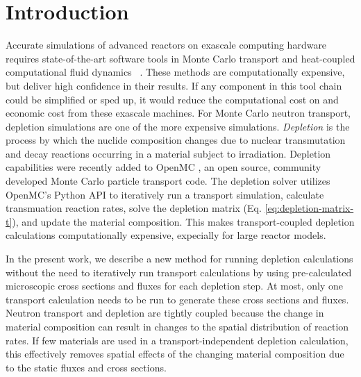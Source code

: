 \section{Introduction}\label{}

    Accurate simulations of advanced reactors on exascale computing hardware
    requires state-of-the-art software tools in Monte Carlo transport and
    heat-coupled computational fluid dynamics
    ~\citep{romano2021nse,merzari2023sc}.  These methods are computationally
    expensive, but deliver high confidence in their results. If any component in
    this tool chain could be simplified or sped up, it would reduce the
    computational cost on and economic cost from these exascale machines. For
    Monte Carlo neutron transport, depletion simulations are one of the more
    expensive simulations. {\it Depletion} is the process by which the nuclide
    composition changes due to nuclear transmutation and decay reactions
    occurring in a material subject to irradiation. Depletion capabilities were
    recently added \citep{ romano_depletion_2021} to OpenMC
    \citep{romano_openmc_2015}, an open source, community developed Monte Carlo
    particle transport code. The depletion solver utilizes OpenMC's Python API
    to iteratively run a transport simulation, calculate transmuation reaction
    rates, solve the depletion matrix (Eq. \ref{eq:depletion-matrix-t}), and
    update the material composition. This makes transport-coupled depletion
    calculations computationally expensive, expecially for large reactor models.
    
    In the present work, we describe a new method for running depletion
    calculations without the need to iteratively run transport calculations by
    using pre-calculated microscopic cross sections and fluxes for each depletion
    step. At most, only one transport calculation needs to be run to generate
    these cross sections and fluxes. Neutron transport and depletion are tightly
    coupled because the change in material composition can result in changes to
    the spatial distribution of reaction rates. If few materials are used in a
    transport-independent depletion calculation, this effectively removes
    spatial effects of the changing material composition due to the static
    fluxes and cross sections.

